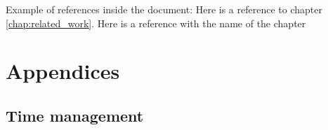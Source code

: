 \documentclass[BSP,english,oneside]{classes/gucthesis}
\newcommand{\comment}[1]{\textcolor{blue}{\emph{#1}}}
\newcommand{\todo}[1]{{\par\noindent\textbf{\textsc{\color{Gray}todo:}}\color{green}#1}}
\begin{document}
Example of references inside the document:
	Here is a reference to chapter \ref{chap:related_work}.
	Here is a reference with the name of the chapter 



\part{Appendices}

\appendix %




\printnoidxglossary[sort=word]

\chapter{Time management}
	\label{appx:time_management}
	




% 

% 

% 


\end{document}
